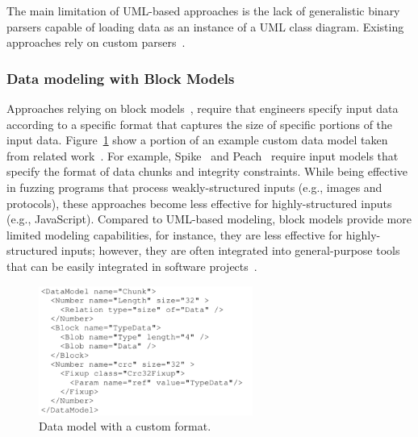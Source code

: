 

The main limitation of UML-based approaches is the lack of generalistic binary parsers capable of loading data as an instance of a UML class diagram. Existing approaches rely on custom parsers~\cite{di2015generating,di2015evolutionary}.

\subsubsection{Data modeling with Block Models}

Approaches relying on block models~\cite{PeachFuzzer,spike,pham2016model}, require that engineers specify input data according to a specific format that captures the size of specific portions of the input data. 
Figure~\ref{fig:pit} show a portion of an example custom data model taken from related work~\cite{pham2016model}.
For example, Spike~\cite{spike} and Peach~\cite{PeachFuzzer} require input models that specify the format of data chunks and integrity constraints. 
While being effective in fuzzing programs that process weakly-structured inputs (e.g., images and protocols), these approaches become less effective for highly-structured inputs (e.g., JavaScript).
Compared to UML-based modeling, block models provide more limited modeling capabilities, for instance, they are less effective for highly-structured inputs; however, they are often integrated into general-purpose tools that can be easily integrated in software projects~\cite{PeachFuzzer}.


\begin{figure}[t!]
  \centering
    \includegraphics[width=7cm]{images/PeachPit}
      \caption{Data model with a custom format.}
      \label{fig:pit}
\end{figure}
